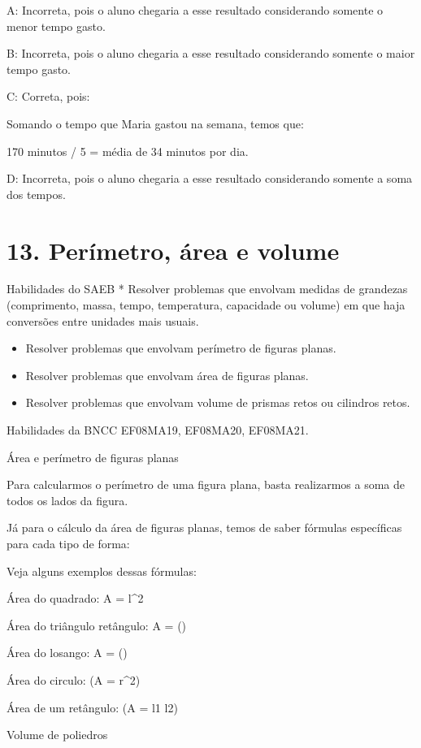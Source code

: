 {A: Incorreta, pois o aluno chegaria a esse resultado considerando
somente o menor tempo gasto.

B: Incorreta, pois o aluno chegaria a esse resultado considerando
somente o maior tempo gasto.

C: Correta, pois:

Somando o tempo que Maria gastou na semana, temos que:

170 minutos / 5 = média de 34 minutos por dia.

D: Incorreta, pois o aluno chegaria a esse resultado considerando
somente a soma dos tempos.


\section{13. Perímetro, área e
volume}

Habilidades do SAEB * Resolver problemas que envolvam medidas de
grandezas (comprimento, massa, tempo, temperatura, capacidade ou volume)
em que haja conversões entre unidades mais usuais.

\begin{itemize}
\item
  Resolver problemas que envolvam perímetro de figuras planas.
\item
  Resolver problemas que envolvam área de figuras planas.
\item
  Resolver problemas que envolvam volume de prismas retos ou cilindros
  retos.
\end{itemize}

Habilidades da BNCC EF08MA19, EF08MA20, EF08MA21.

Área e perímetro de figuras planas

Para calcularmos o perímetro de uma figura plana, basta realizarmos a
soma de todos os lados da figura.

Já para o cálculo da área de figuras planas, temos de saber fórmulas
específicas para cada tipo de forma:

Veja alguns exemplos dessas fórmulas:

Área do quadrado: A = l^2

Área do triângulo retângulo: A = ()

Área do losango: A = ()

Área do circulo: (A = \pi r^{2})

Área de um retângulo: (A = l1 \times l2)

Volume de poliedros

}
